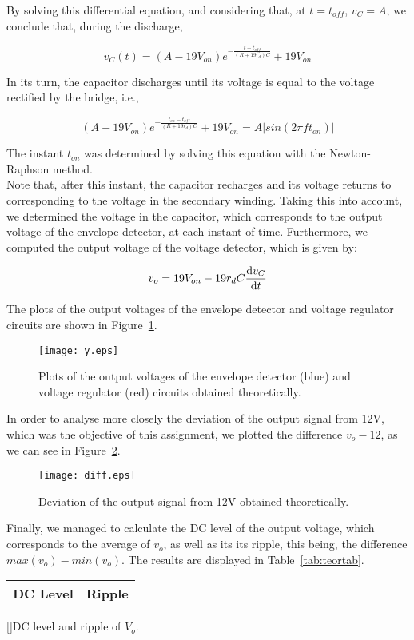 By solving this differential equation, and considering that, at $t=t_{off}$, $v_C=A$, we conclude that, during the discharge,

\begin{equation}
v_C(t) = (A-19V_{on})e^{-\frac{t-t_{off}}{(R+19r_d)C}}+19V_{on}
\end{equation}

In its turn, the capacitor discharges until its voltage is equal to the voltage rectified by the bridge, i.e.,

\begin{equation}
(A-19V_{on})e^{-\frac{t_{on}-t_{off}}{(R+19r_d)C}}+19V_{on} = A\left|sin(2\pi ft_{on})\right|
\end{equation}

The instant $t_{on}$ was determined by solving this equation with the Newton-Raphson method. \\

Note that, after this instant, the capacitor recharges and its voltage returns to corresponding to the voltage in the secondary winding. Taking this into account, we determined the voltage in the capacitor, which corresponds to the output voltage of the envelope detector, at each instant of time. Furthermore, we computed the output voltage of the voltage detector, which is given by:

\begin{equation}
v_o = 19V_{on}-19 r_d C\odv{v_C}{t}
\end{equation}

The plots of the output voltages of the envelope detector and voltage regulator circuits are shown in Figure~\ref{fig:teorplots}.

\begin{figure}[H] \centering
\texttt{[image: y.eps]}
\caption{Plots of the output voltages of the envelope detector (blue) and voltage regulator (red) circuits obtained theoretically.}
\label{fig:teorplots}
\end{figure}

In order to analyse more closely the deviation of the output signal from 12V, which was the objective of this assignment, we plotted the difference $v_o-12$, as we can see in Figure~\ref{fig:diff}.

\begin{figure}[H] \centering
\texttt{[image: diff.eps]}
\caption{Deviation of the output signal from 12V obtained theoretically.}
\label{fig:diff}
\end{figure}

Finally, we managed to calculate the DC level of the output voltage, which corresponds to the average of $v_o$, as well as its its ripple, this being, the difference $max(v_o)-min(v_o)$. The results are displayed in Table~\ref{tab:teortab}.

\begin{center}
\begin{tabular}{ | c | c | }\hline
DC Level & Ripple \\
\hline
 
\end{tabular}
[]{DC level and ripple of $V_o$.}
\label{tab:teortab}
\end{center}
